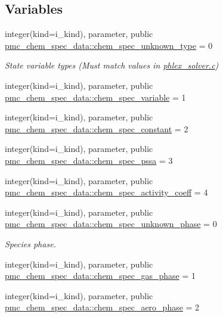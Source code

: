 \subsection*{Variables}
\begin{DoxyCompactItemize}
\item 
integer(kind=i\+\_\+kind), parameter, public \mbox{\hyperlink{namespacepmc__chem__spec__data_ae7eff771bed84dc4299dd62c51b815d4}{pmc\+\_\+chem\+\_\+spec\+\_\+data\+::chem\+\_\+spec\+\_\+unknown\+\_\+type}} = 0
\begin{DoxyCompactList}\small\item\em State variable types (Must match values in \mbox{\hyperlink{phlex__solver_8c}{phlex\+\_\+solver.\+c}}) \end{DoxyCompactList}\item 
integer(kind=i\+\_\+kind), parameter, public \mbox{\hyperlink{namespacepmc__chem__spec__data_a4185155315475e6460a4e37385298daf}{pmc\+\_\+chem\+\_\+spec\+\_\+data\+::chem\+\_\+spec\+\_\+variable}} = 1
\item 
integer(kind=i\+\_\+kind), parameter, public \mbox{\hyperlink{namespacepmc__chem__spec__data_a0bf400fe217f79a52fcf4d1cc19f1ddc}{pmc\+\_\+chem\+\_\+spec\+\_\+data\+::chem\+\_\+spec\+\_\+constant}} = 2
\item 
integer(kind=i\+\_\+kind), parameter, public \mbox{\hyperlink{namespacepmc__chem__spec__data_adf3fa2aa29982546ef1d89f3587e97ca}{pmc\+\_\+chem\+\_\+spec\+\_\+data\+::chem\+\_\+spec\+\_\+pssa}} = 3
\item 
integer(kind=i\+\_\+kind), parameter, public \mbox{\hyperlink{namespacepmc__chem__spec__data_a889aa5b1d886de2d985a0c159ed3cc07}{pmc\+\_\+chem\+\_\+spec\+\_\+data\+::chem\+\_\+spec\+\_\+activity\+\_\+coeff}} = 4
\item 
integer(kind=i\+\_\+kind), parameter, public \mbox{\hyperlink{namespacepmc__chem__spec__data_a54930626ee81dd6c28d24dc6efd2f1f7}{pmc\+\_\+chem\+\_\+spec\+\_\+data\+::chem\+\_\+spec\+\_\+unknown\+\_\+phase}} = 0
\begin{DoxyCompactList}\small\item\em Species phase. \end{DoxyCompactList}\item 
integer(kind=i\+\_\+kind), parameter, public \mbox{\hyperlink{namespacepmc__chem__spec__data_ac8acedb2cfaed6968979fc1cc59e76a6}{pmc\+\_\+chem\+\_\+spec\+\_\+data\+::chem\+\_\+spec\+\_\+gas\+\_\+phase}} = 1
\item 
integer(kind=i\+\_\+kind), parameter, public \mbox{\hyperlink{namespacepmc__chem__spec__data_a1076e0bc8b754d3cf8e43333e92afc81}{pmc\+\_\+chem\+\_\+spec\+\_\+data\+::chem\+\_\+spec\+\_\+aero\+\_\+phase}} = 2

\end{DoxyCompactItemize}
